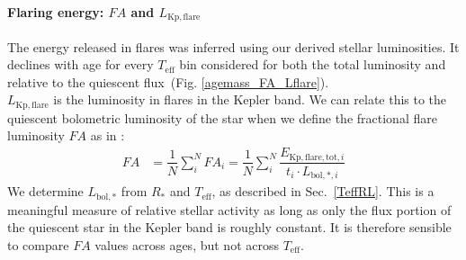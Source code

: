 \documentclass{aa}
\begin{document}
\paragraph{Flaring energy: $FA$ and $L_\mathrm{Kp,flare}$}
The energy released in flares was inferred using our derived stellar luminosities. It declines with age for every $T_\mathrm{eff}$ bin considered for both the total luminosity and relative to the quiescent flux~(Fig. \ref{agemass_FA_Lflare}).
\\
$L_\mathrm{Kp,flare}$ is the luminosity in flares in the Kepler band. We can relate this to the quiescent bolometric luminosity of the star when we define the fractional flare luminosity $FA$ as in :
\begin{align}
\label{FA}
FA&=\dfrac{1}{N}\displaystyle\sum_{i}^{N} FA_i = \dfrac{1}{N} \displaystyle\sum_{i}^{N} \dfrac{E_{\mathrm{Kp,flare,tot,}i}}{t_i\cdot L_{\mathrm{bol,*,}i}}
\end{align}
We determine $L_\mathrm{bol,*}$ from $R_*$ and $T_\mathrm{eff}$, as described in Sec.~\ref{TeffRL}. This is a meaningful measure of relative stellar activity as long as only the flux portion of the quiescent star in the Kepler band is roughly constant. It is therefore sensible to compare $FA$ values across ages, but not across $T_\mathrm{eff}$.
\end{document}
